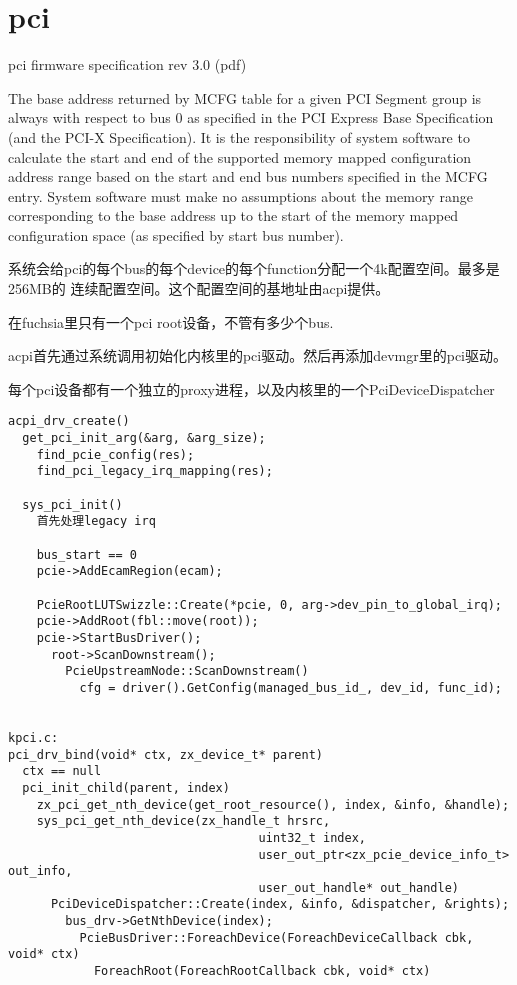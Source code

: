 \section{pci}

pci firmware specification rev 3.0 (pdf)

The base address returned by MCFG table for a given PCI Segment group is always
with respect to bus 0 as specified in the PCI Express Base Specification (and
the PCI-X Specification). It is the responsibility of system software to
calculate the start and end of the supported memory mapped configuration address
range based on the start and end bus numbers specified in the MCFG entry. System
software must make no assumptions about the memory range corresponding to the
base address up to the start of the memory mapped configuration space (as
specified by start bus number).

系统会给pci的每个bus的每个device的每个function分配一个4k配置空间。最多是256MB的
连续配置空间。这个配置空间的基地址由acpi提供。

在fuchsia里只有一个pci root设备，不管有多少个bus.

acpi首先通过系统调用初始化内核里的pci驱动。然后再添加devmgr里的pci驱动。

每个pci设备都有一个独立的proxy进程，以及内核里的一个PciDeviceDispatcher

\begin{verbatim}
acpi_drv_create()
  get_pci_init_arg(&arg, &arg_size);
    find_pcie_config(res);
    find_pci_legacy_irq_mapping(res);

  sys_pci_init()
    首先处理legacy irq

    bus_start == 0
    pcie->AddEcamRegion(ecam);

    PcieRootLUTSwizzle::Create(*pcie, 0, arg->dev_pin_to_global_irq);
    pcie->AddRoot(fbl::move(root));
    pcie->StartBusDriver();
      root->ScanDownstream();
        PcieUpstreamNode::ScanDownstream()
          cfg = driver().GetConfig(managed_bus_id_, dev_id, func_id);


kpci.c:
pci_drv_bind(void* ctx, zx_device_t* parent)
  ctx == null
  pci_init_child(parent, index)
    zx_pci_get_nth_device(get_root_resource(), index, &info, &handle);
    sys_pci_get_nth_device(zx_handle_t hrsrc,
                                   uint32_t index,
                                   user_out_ptr<zx_pcie_device_info_t> out_info,
                                   user_out_handle* out_handle)
      PciDeviceDispatcher::Create(index, &info, &dispatcher, &rights);
        bus_drv->GetNthDevice(index);
          PcieBusDriver::ForeachDevice(ForeachDeviceCallback cbk, void* ctx)
            ForeachRoot(ForeachRootCallback cbk, void* ctx)


\end{verbatim}